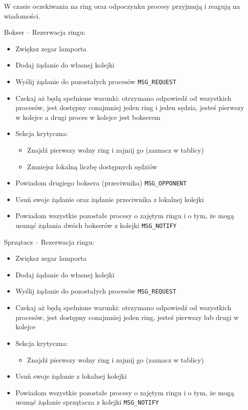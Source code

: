 \documentclass{article}
\begin{document}
W czasie oczekiwania na ring oraz odpoczynku procesy przyjmują i reagują
na wiadomości.

Bokser -- Rezerwacja ringu:
\begin{itemize}
    \item Zwiększ zegar lamporta
    \item Dodaj żądanie do własnej kolejki
    \item Wyślij żądanie do pozostałych procesów \verb|MSG_REQUEST|
    \item Czekaj aż będą spełnione warunki: otrzymano odpowiedź od
    wszystkich procesów, jest dostępny conajmniej jeden ring i jeden
    sędzia, jesteś pierwszy w kolejce a drugi proces w kolejce jest
    bokserem
    \item Sekcja krytyczna:
    \begin{itemize}
        \item Znajdź pierwszy wolny ring i zajmij go (zaznacz w tablicy)
        \item Zmniejsz lokalną liczbę dostępnych sędziów
    \end{itemize}
    \item Powiadom drugiego boksera (przeciwnika) \verb|MSG_OPPONENT|
    \item Usuń swoje żądanie oraz żądanie przeciwnika z lokalnej kolejki
    \item Powiadom wszystkie pozostałe procesy o zajętym ringu i o tym,
    że mogą usunąć żądania dwóch bokserów z kolejki \verb|MSG_NOTIFY|
\end{itemize}

Sprzątacz -- Rezerwacja ringu:
\begin{itemize}
    \item Zwiększ zegar lamporta
    \item Dodaj żądanie do własnej kolejki
    \item Wyślij żądanie do pozostałych procesów \verb|MSG_REQUEST|
    \item Czekaj aż będą spełnione warunki: otrzymano odpowiedź od
    wszystkich procesów, jest dostępny conajmniej jeden ring, jesteś
    pierwszy lub drugi w kolejce
    \item Sekcja krytyczna:
    \begin{itemize}
        \item Znajdź pierwszy wolny ring i zajmij go (zaznacz w tablicy)
    \end{itemize}
    \item Usuń swoje żądanie z lokalnej kolejki
    \item Powiadom wszystkie pozostałe procesy o zajętym ringu i o tym,
    że mogą usunąć żądanie sprzątacza z kolejki \verb|MSG_NOTIFY|
\end{itemize}
\end{document}
